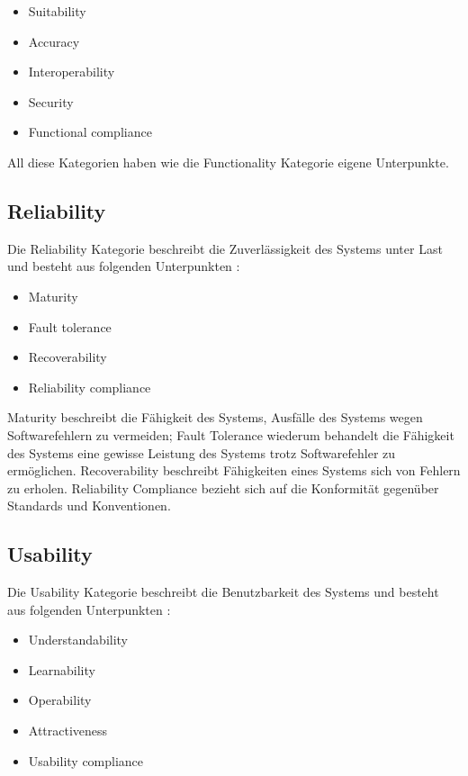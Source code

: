 \begin{itemize}
  \item \glqq Suitability\grqq
  \item \glqq Accuracy\grqq
  \item \glqq Interoperability\grqq
  \item \glqq Security\grqq
  \item \glqq Functional compliance\grqq
\end{itemize}

All diese Kategorien haben wie die Functionality Kategorie eigene Unterpunkte.

\subsection{Reliability}
Die Reliability Kategorie beschreibt die Zuverlässigkeit des Systems unter Last und besteht aus folgenden Unterpunkten \cite[S. 7]{ISO_SQ}:

\begin{itemize}
  \item \glqq Maturity\grqq
  \item \glqq Fault tolerance\grqq
  \item \glqq Recoverability\grqq
  \item \glqq Reliability compliance\grqq
\end{itemize}

Maturity beschreibt die Fähigkeit des Systems, Ausfälle des Systems wegen Softwarefehlern zu vermeiden; Fault Tolerance wiederum behandelt die Fähigkeit des Systems eine gewisse Leistung des Systems trotz Softwarefehler zu ermöglichen. Recoverability beschreibt Fähigkeiten eines Systems  sich von Fehlern zu erholen. Reliability Compliance bezieht sich auf die Konformität gegenüber Standards und Konventionen. \cite[S. 8-9]{ISO_SQ}

\subsection{Usability}
Die Usability Kategorie beschreibt die Benutzbarkeit des Systems und besteht aus folgenden Unterpunkten \cite[S. 7]{ISO_SQ}:

\begin{itemize}
  \item \glqq Understandability\grqq
  \item \glqq Learnability\grqq
  \item \glqq Operability\grqq
  \item \glqq Attractiveness\grqq
  \item \glqq Usability compliance\grqq
\end{itemize}

